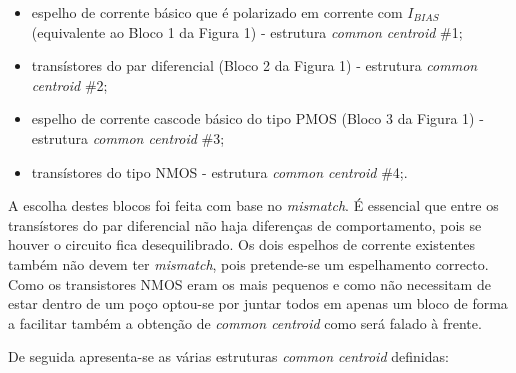 \documentclass[11pt]{article}
\numberwithin{equation}{section}
\begin{document}
\vspace{-2mm}

\begin{itemize}
	\item espelho de corrente básico que é polarizado em corrente com $I_{BIAS}$ (equivalente ao Bloco 1 da Figura 1) - estrutura \textit{common centroid} \#1;
	\vspace{-2mm}
	\item transístores do par diferencial (Bloco 2 da Figura 1) - estrutura \textit{common centroid} \#2;
	\vspace{-2mm}
	\item espelho de corrente cascode básico do tipo PMOS (Bloco 3 da Figura 1) - estrutura \textit{common centroid} \#3;
	\vspace{-2mm}
	\item transístores do tipo NMOS - estrutura \textit{common centroid} \#4;.
\end{itemize}

A escolha destes blocos foi feita com base no \textit{mismatch}. É essencial que entre os transístores do par diferencial não haja diferenças de comportamento, pois se houver o circuito fica desequilibrado. Os dois espelhos de corrente existentes também não devem ter \textit{mismatch}, pois pretende-se um espelhamento correcto. Como os transistores NMOS eram os mais pequenos e como não necessitam de estar dentro de um poço optou-se por juntar todos em apenas um bloco de forma a facilitar também a obtenção de \textit{common centroid} como será falado à frente.

De seguida apresenta-se as várias estruturas \textit{common centroid} definidas:
\end{document}
